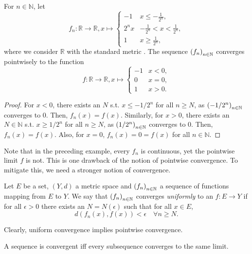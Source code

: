 \begin{exmp}
	For $n\in\mathbb N$, let 
	\[
		f_n: \mathbb R\to\mathbb R, x\mapsto \begin{cases}
			   -1 & x \leq -\frac{1}{2^n},
			\\ 2^{n}x & -\frac{1}{2^n} < x < \frac{1}{2^n},
			\\ 1 & x \geq \frac{1}{2^n},
		\end{cases}
	\] 
	where we consider $\mathbb R$ with the standard metric \cite{src:uniform_continuity_convergence}. The sequence $\seq[f_n]$ converges pointwisely to the function
	\[
		f: \mathbb R\to\mathbb R, x\mapsto \begin{cases}
			   -1 & x < 0,
			 \\ 0 & x = 0,
			 \\ 1 & x > 0.
		\end{cases}
	\]
\end{exmp}

\begin{proof}
	For $x < 0$, there exists an $N$ s.t. $x\leq -1/2^n$ for all $n\geq N$, as $\seq[-1/2^n]$ converges to $0$. Then, $f_n(x) = f(x)$. Similarly, for $x > 0$, there exists an $N\in\mathbb N$ s.t. $x \geq 1/2^n$ for all $n\geq N$, as $\seq[1/2^n]$ converges to $0$. Then, $f_n(x) = f(x)$. Also, for $x = 0$, $f_n(x) = 0 = f(x)$ for all $n\in\mathbb N$.
\end{proof}

\begin{remark}
	Note that in the preceding example, every $f_n$ is continuous, yet the pointwise limit $f$ is not. This is one drawback of the notion of pointwise convergence. To mitigate this, we need a stronger notion of convergence.
\end{remark}

\begin{defn}
	Let $E$ be a set, $(Y, d)$ a metric space and $\seq[f_n]$ a sequence of functions mapping from $E$ to $Y$. We say that $\seq[f_n]$ converges \textit{uniformly} to an $f: E\to Y$ if for all $\epsilon > 0$ there exists an $N = N(\epsilon)$ such that for all $x\in E$, 
	\[
		d(f_n(x), f(x)) < \epsilon \quad\forall n\geq N.
	\]  
\end{defn}

\begin{remark}
	Clearly, uniform convergence implies pointwise convergence.
\end{remark}

\begin{theorem}\label{thrm:seq_convergence_subsequences}
	A sequence is convergent iff every subsequence converges to the same limit.
\end{theorem}

